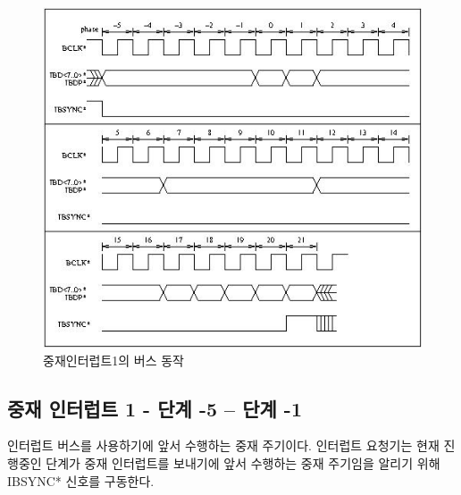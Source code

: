 \begin{figure}[htb]
    \centerline{\includegraphics{ch4/FIG/arb1-int.jpg}}
   \caption{중재인터럽트1의 버스 동작}\label{figure:arb1-int}
\end{figure}
%
%
\subsection*{중재 인터럽트 1 - 단계 -5 -- 단계 -1}
인터럽트 버스를 사용하기에 앞서 수행하는 중재 주기이다.
인터럽트 요청기는 현재 진행중인 단계가 중재 인터럽트를 보내기에 앞서 수행하는 중재 주기임을
알리기 위해 IBSYNC* 신호를 구동한다.
%
